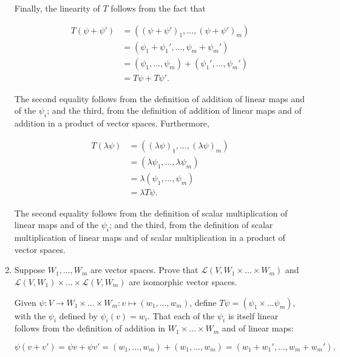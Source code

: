 \documentclass{book}
\begin{document}
\begin{enumerate}
Finally, the linearity of \(T\) follows from the fact that

\begin{equation*}
    \begin{split}
        T(\psi+\psi') &= ((\psi+\psi')_1,\dots,(\psi+\psi')_m) \\
        &= (\psi_1+\psi_1',\dots,\psi_m+\psi_m') \\
        &= (\psi_1,\dots,\psi_m) + (\psi_1',\dots,\psi_m') \\
        &= T\psi + T\psi'.
    \end{split}
\end{equation*}

The second equality follows from the definition of addition of linear maps and of the \(\psi_i\); and the third, from the definition of addition of linear maps and of addition in a product of vector spaces.  Furthermore, 

\begin{equation*}
    \begin{split}
        T(\lambda\psi) &= ((\lambda\psi)_1,\dots,(\lambda\psi)_m) \\
        &= (\lambda\psi_1,\dots,\lambda\psi_m) \\
        &= \lambda(\psi_1,\dots,\psi_m) \\
        &= \lambda T\psi.
    \end{split}
\end{equation*}

The second equality follows from the definition of scalar multiplication of linear maps and of the \(\psi_i\); and the third, from the definition of scalar multiplication of linear maps and of scalar multiplication in a product of vector spaces.

\item Suppose \(W_1,\dots,W_m\) are vector spaces.  Prove that \(\mathcal{L}(V,W_1 \times \dots \times W_m)\) and \(\mathcal{L}(V,W_1) \times \dots \times \mathcal{L}(V,W_m)\) are isomorphic vector spaces.

Given \(\psi:V \rightarrow W_1 \times \dots \times W_m:v \mapsto (w_1,\dots,w_m)\), define \(T\psi = (\psi_1 \times \dots \psi_m)\), with the \(\psi_i\) defined by \(\psi_i(v)=w_i\).  That each of the \(\psi_i\) is itself linear follows from the definition of addition in \(W_1 \times \dots \times W_m\) and of linear maps:

\begin{equation*}
    \psi(v+v') = \psi v+\psi v' = (w_1,\dots,w_m)+(w_1,\dots,w_m)=(w_1+w_1',\dots,w_m+w_m').
\end{equation*}


\end{enumerate}
\end{document}
